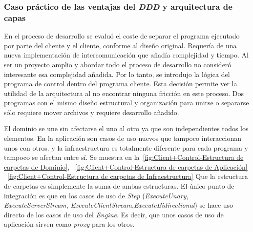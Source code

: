 \subsubsection{Caso práctico de las ventajas del \textit{DDD} y arquitectura de capas}

En el proceso de desarrollo se evaluó el coste de separar el programa ejecutado por parte del cliente y el cliente, conforme al diseño original.
Requería de una nueva implementación de intercomunicación que añadía complejidad y tiempo.
Al ser un proyecto amplio y abordar todo el proceso de desarrollo no consideró interesante esa complejidad añadida.
Por lo tanto, se introdujo la lógica del programa de control dentro del programa cliente.
Esta decisión permite ver la utilidad de la arquitectura al no encontrar ninguna fricción en este proceso.
Dos programas con el mismo diseño estructural y organización para unirse o separarse sólo requiere mover archivos y requiere desarrollo añadido.

El dominio se une sin afectarse el uno al otro ya que son independientes todos los elementos.
En la aplicación son casos de uso nuevos que tampoco interaccionan unos con otros.
y la infraestructura es totalmente diferente para cada programa y tampoco se afectan entre sí.
Se muestra en la~\cref{fig:Client+Control-Estructura de carpetas de Dominio},
~\cref{fig:Client+Control-Estructura de carpetas de Aplicación}
~\cref{fig:Client+Control-Estructura de carpetas de Infraestructura}
Que la estructura de carpetas es simplemente la suma de ambas estructuras.
El único punto de integración es que en los casos de uso de \textit{Step} (\textit{ExecuteUnary}, \textit{ExecuteServerStream}, \textit{ExecuteClientStream},\textit{ExecuteBidirectional}) se hace uso directo de los casos de uso del \textit{Engine}.
Es decir, que unos casos de uso de aplicación sirven como \textit{proxy} para los otros.

